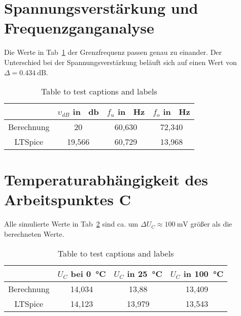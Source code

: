     \section{Spannungsverstärkung und Frequenzganganalyse}
        Die Werte in Tab~\ref{tab:frequenz} der Grenzfrequenz passen genau zu einander. Der Unterschied bei der Spannungsverstärkung  beläuft sich auf einen Wert von \(\Delta = \SI{0.434}{\dB}\).
        \begin{table}[h!]
            \centering
            \caption{Table to test captions and labels}
            \begin{tabular}{| c | c | c | c |} 
                \hline
                & \(\upsilon_{dB}\) in \SI{}{\decibel} & \(f_u\) in \SI{}{\Hz}  & \(f_o\) in \SI{}{\Hz}  \\
                \hline
                Berechnung & 20 & 60,630 & 72,340 \\ 
                \hline
                LTSpice & 19,566 & 60,729 & 13,968 \\
                \hline
            \end{tabular}
            \label{tab:frequenz}
        \end{table}
    \section{Temperaturabhängigkeit des Arbeitspunktes C}
        Alle simulierte Werte in Tab~\ref{tab:temp} sind ca. um \(\Delta U_C\approx \SI{100}{\milli\volt}\) größer als die berechneten Werte.
        \begin{table}[h!]
            \centering
            \caption{Table to test captions and labels}
            \begin{tabular}{| c | c | c | c |} 
                \hline
                & \(U_C\) bei \SI{0}{\degreeCelsius} & \(U_C\) in \SI{25}{\degreeCelsius}  & \(U_C\) in \SI{100}{\degreeCelsius}  \\
                \hline
                Berechnung & 14,034 & 13,88 & 13,409 \\ 
                \hline
                LTSpice & 14,123 & 13,979 & 13,543 \\
                \hline
            \end{tabular}
            \label{tab:temp}
        \end{table}